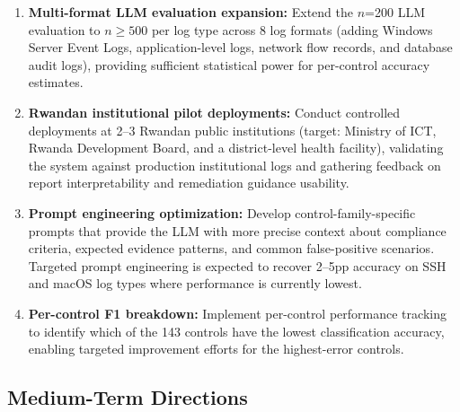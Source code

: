 \documentclass[12pt,oneside]{report}
\begin{document}
\begin{enumerate}
  \item \textbf{Multi-format LLM evaluation expansion:} Extend the $n$=200 LLM evaluation to $n \geq 500$ per log type across 8 log formats (adding Windows Server Event Logs, application-level logs, network flow records, and database audit logs), providing sufficient statistical power for per-control accuracy estimates.

  \item \textbf{Rwandan institutional pilot deployments:} Conduct controlled deployments at 2--3 Rwandan public institutions (target: Ministry of ICT, Rwanda Development Board, and a district-level health facility), validating the system against production institutional logs and gathering feedback on report interpretability and remediation guidance usability.

  \item \textbf{Prompt engineering optimization:} Develop control-family-specific prompts that provide the LLM with more precise context about compliance criteria, expected evidence patterns, and common false-positive scenarios. Targeted prompt engineering is expected to recover 2--5pp accuracy on SSH and macOS log types where performance is currently lowest.

  \item \textbf{Per-control F1 breakdown:} Implement per-control performance tracking to identify which of the 143 controls have the lowest classification accuracy, enabling targeted improvement efforts for the highest-error controls.
\end{enumerate}

\subsection{Medium-Term Directions}
\end{document}
